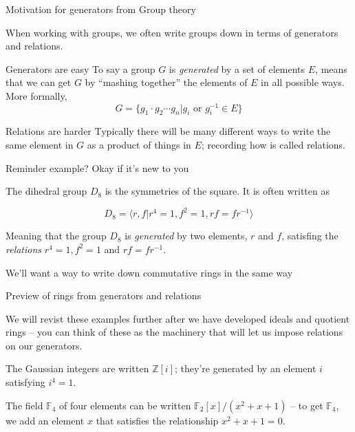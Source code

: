 \documentclass{beamer}
\begin{document}
\begin{frame}{Motivation for generators from Group theory}

When working with groups, we often write groups down in terms of generators and relations.

\begin{block}{Generators are easy}
To say a group $G$ is \emph{generated} by a set of elements $E$, means that we can get $G$ by ``mashing together'' the elements of $E$ in all possible ways. More formally, 
$$G=\{g_1\cdot g_2\cdots g_n | g_i \text{ or } g_i^{-1}\in E\}$$
\end{block}


\begin{block}{Relations are harder}
Typically there will be many different ways to write the same element in $G$ as a product of things in $E$; recording how is called relations.
\end{block}
\end{frame}

\begin{frame}{Reminder example?  Okay if it's new to you }
\begin{example}
The dihedral group $D_{8}$ is the symmetries of the square.  It is often written as

$$D_8=\langle r,f | r^4=1, f^2=1, rf=fr^{-1}\rangle $$

Meaning that the group $D_8$ is \emph{generated} by two elements, $r$ and $f$, satisfing the \emph{relations} $r^4=1, f^2=1$ and $rf=fr^{-1}$.
\end{example}

\begin{block}{We'll want a way to write down commutative rings in the same way}
\end{block}


\end{frame}


\begin{frame}{Preview of rings from generators and relations}

We will revist these examples further after we have developed ideals and quotient rings -- you can think of these as the machinery that will let us impose relations on our generators.

\begin{example}
The Gaussian integers are written $\mathbb{Z}[i]$; they're generated by an element $i$ satisfying $i^4=1$.
\end{example}

\begin{example}
The field $\mathbb{F}_4$ of four elements can be written $\mathbb{F}_2[x]/(x^2+x+1)$ -- to get $\mathbb{F}_4$, we add an element $x$ that satisfies the relationship $x^2+x+1=0$.
\end{example}

\end{frame}
\end{document}
